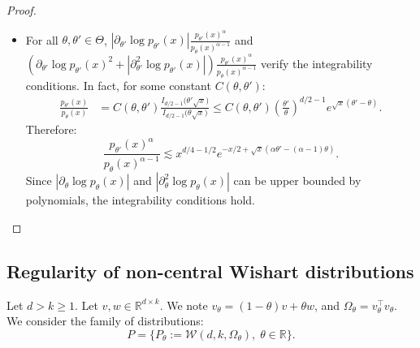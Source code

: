 \documentclass{article}
\theoremstyle{plain}
\theoremstyle{definition}
\theoremstyle{remark}
\begin{document}
\begin{proof}
\begin{itemize}
\begin{align*}
            |\partial_\theta^2 \log p_\theta(x)| &\leq- 1 + \frac{\theta}{2d} + \frac{\theta}{2} \left( 1 + \frac{\theta\sqrt{x}}{d} + \frac{\theta^2 x}{d^2}\right).
        \end{align*}
        Moreover, $p_\theta$ have exponentially light tails. In fact, leveraging Lemma~\ref{lem:bessel-ratio-bound}, $I_{d/2-1}(\theta\sqrt{x}) \leq I_{d/2-1}(1) \theta \sqrt{x} e^{\theta \sqrt{x} -1}$, and:
        \begin{align*}
            p_\theta(x) &= \frac{1}{2} e^{-(\theta^2 + x)/2} \left(\frac{x}{\theta^2}\right)^{d/4-1/2} I_{d/2-1}(\theta\sqrt{x})\\
            &\lesssim x^{d/4-1/2} e^{-x/2 + \theta \sqrt{x}}.
        \end{align*}
        
        As $|\partial_\theta \log p_\theta(x)|$ and $|\partial_\theta^2 \log p_\theta(x)|$ can be upper bounded by polynomials, the integrability conditions hold.
        \item For all $\theta, \theta' \in \Theta$, $\left|\partial_{\theta'}\log p_{\theta'}(x)\right|\frac{p_{\theta'}(x)^\alpha}{p_{\theta}(x)^{\alpha-1}}$ and $\left(\partial_{\theta'} \log p_{\theta'} (x)^2 +\left| \partial_{\theta'}^2\log p_{\theta'}(x)\right|\right)\frac{p_{\theta'}(x)^\alpha}{p_{\theta}(x)^{\alpha-1}}$ verify the integrability conditions.
        In fact, for some constant $C(\theta,\theta')$:
        \begin{align*}
            \frac{p_{\theta'}(x)}{p_{\theta}(x)} &= C(\theta, \theta')  \frac{I_{d/2-1}\big(\theta'\sqrt{x}\big)}{I_{d/2-1}\big(\theta\sqrt{x}\big)} \leq C(\theta, \theta') \left(\frac{\theta'}{\theta}\right)^{d/2-1} e^{\sqrt{x}(\theta' - \theta)}.
        \end{align*}
        Therefore: \[\frac{p_{\theta'}(x)^\alpha}{p_{\theta}(x)^{\alpha-1}} \lesssim x^{d/4-1/2} e^{-x/2 + \sqrt{x} (\alpha\theta'-(\alpha-1)\theta)}.\]
        Since $|\partial_\theta \log p_\theta(x)|$ and $|\partial_\theta^2 \log p_\theta(x)|$ can be upper bounded by polynomials, the integrability conditions hold.
    \end{itemize}
\end{proof}


\subsection{Regularity of non-central Wishart distributions}

Let $d > k \geq 1$. Let $v,w \in \mathbb{R}^{d \times k}$. We note $v_\theta = (1-\theta) v + \theta w$, and $\Omega_\theta = v_\theta^\top v_\theta$. We consider the family of distributions: \[P = \{P_\theta := \mathcal{W}(d,k,\Omega_\theta),\; \theta \in \mathbb{R}\}.\]
\end{document}
